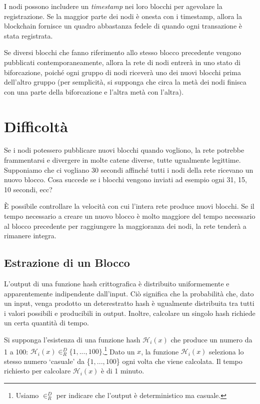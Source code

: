 I nodi possono includere un \emph{timestamp} nei loro blocchi per agevolare la registrazione. Se la maggior parte dei nodi è onesta con i timestamp, allora la blockchain fornisce un quadro abbastanza fedele di quando ogni transazione è stata registrata.

Se diversi blocchi che fanno riferimento allo stesso blocco precedente vengono pubblicati contemporaneamente, allora la rete di nodi entrerà in uno stato di biforcazione, poiché ogni gruppo di nodi riceverà uno dei nuovi blocchi prima dell'altro gruppo (per semplicità, si supponga che circa la metà dei nodi finisca con una parte della biforcazione e l’altra metà con l’altra).



\section{Difficoltà}
\label{sec:difficulty}

Se i nodi potessero pubblicare nuovi blocchi quando vogliono, la rete potrebbe frammentarsi e divergere in molte catene diverse, tutte ugualmente legittime. Supponiamo che ci vogliano 30 secondi affinché tutti i nodi della rete ricevano un nuovo blocco. Cosa succede se i blocchi vengono inviati ad esempio ogni 31, 15, 10 secondi, ecc?

È possibile controllare la velocità con cui l’intera rete produce nuovi blocchi. Se il tempo necessario a creare un nuovo blocco è molto maggiore del tempo necessario al blocco precedente per raggiungere la maggioranza dei nodi, la rete tenderà a rimanere integra.


\subsection{Estrazione di un Blocco}

L’output di una funzione hash crittografica è distribuito uniformemente e apparentemente indipendente dall’input. Ciò significa che la probabilità che, dato un input, venga prodotto un deterestratto hash è ugualmente distribuita tra tutti i valori possibili e producibili in output. Inoltre, calcolare un singolo hash richiede un certa quantità di tempo.

Si supponga l'esistenza di una funzione hash $\mathcal{H}_i(x)$ che produce un numero da 1 a 100: $\mathcal{H}_i(x) \in^D_R \{1,...,100\}$.\footnote{Usiamo $\in^D_R$ per indicare che l’output è deterministico ma casuale.} Dato un $x$, la funzione $\mathcal{H}_i(x)$ seleziona lo stesso numero `casuale' da \{$1,...,100$\} ogni volta che viene calcolata. Il tempo richiesto per calcolare $\mathcal{H}_i(x)$ è di 1 minuto.

